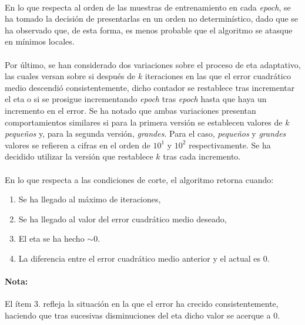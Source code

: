 \documentclass[12pt, twocolumn]{article}
\begin{document}
	\paragraph{} En lo que respecta al orden de las muestras de entrenamiento en cada \textit{epoch}, se ha tomado la decisión de presentarlas en un orden no determinístico, dado que se ha observado que, de esta forma, es menos probable que el algoritmo se atasque en mínimos locales. 
	
	\paragraph{} Por último, se han considerado dos variaciones sobre el proceso de eta adaptativo, las cuales versan sobre si después de $k$ iteraciones en las que el error cuadrático medio descendió consistentemente, dicho contador se restablece tras incrementar el eta o si se prosigue incrementando \textit{epoch} tras \textit{epoch} hasta que haya un incremento en el error. Se ha notado que ambas variaciones presentan comportamientos similares si para la primera versión se establecen valores de $k$ \textit{pequeños} y, para la segunda versión, \textit{grandes}. Para el caso, \textit{pequeños} y \textit{grandes} valores se refieren a cifras en el orden de $10^{1}$ y $10^{2}$ respectivamente. Se ha decidido utilizar la versión que restablece $k$ tras cada incremento.
	
	\paragraph{} En lo que respecta a las condiciones de corte, el algoritmo retorna cuando:
	
	\begin{enumerate}
		\item Se ha llegado al máximo de iteraciones,
		\item Se ha llegado al valor del error cuadrático medio deseado,
		\item El eta se ha hecho $\sim 0$. 
		\item La diferencia entre el error cuadrático medio anterior y el actual es $0$.
	\end{enumerate}
	
	\paragraph{Nota:} El ítem $3.$ refleja la situación en la que el error ha crecido consistentemente, haciendo que tras sucesivas disminuciones del eta dicho valor se acerque a $0$. 
	
\end{document}
